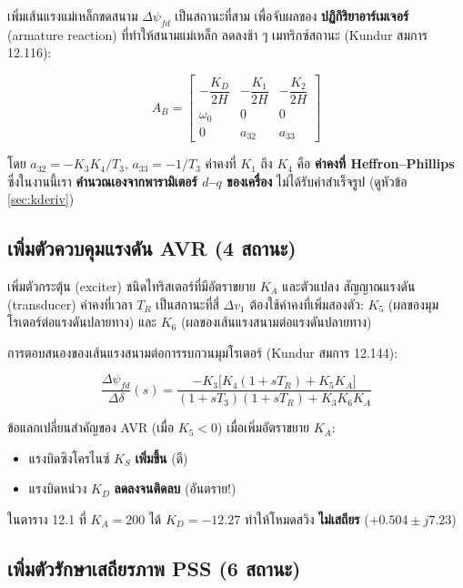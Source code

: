 \documentclass[12pt,a4paper]{article}
\newcommand{\ddel}{\Delta\delta}
\newcommand{\dpsifd}{\Delta\psi_{fd}}
\begin{document}
เพิ่มเส้นแรงแม่เหล็กขดสนาม $\dpsifd$ เป็นสถานะที่สาม เพื่อจับผลของ
\textbf{ปฏิกิริยาอาร์เมเจอร์} (armature reaction) ที่ทำให้สนามแม่เหล็ก
ลดลงช้า ๆ เมทริกซ์สถานะ (Kundur สมการ 12.116):

\begin{equation}
A_B =
\begin{bmatrix}
-\dfrac{K_D}{2H} & -\dfrac{K_1}{2H} & -\dfrac{K_2}{2H} \\[2ex]
\omega_0 & 0 & 0 \\[1ex]
0 & a_{32} & a_{33}
\end{bmatrix}
\end{equation}

โดย $a_{32} = -K_3 K_4/T_3$, $a_{33} = -1/T_3$ ค่าคงที่ $K_1$ ถึง $K_4$
คือ \textbf{ค่าคงที่ Heffron--Phillips} ซึ่งในงานนี้เรา
\textbf{คำนวณเองจากพารามิเตอร์ $d$--$q$ ของเครื่อง} ไม่ได้รับค่าสำเร็จรูป
(ดูหัวข้อ \ref{sec:kderiv})

\subsection{เพิ่มตัวควบคุมแรงดัน AVR (4 สถานะ)}

เพิ่มตัวกระตุ้น (exciter) ชนิดไทริสเตอร์ที่มีอัตราขยาย $K_A$ และตัวแปลง
สัญญาณแรงดัน (transducer) ค่าคงที่เวลา $T_R$ เป็นสถานะที่สี่ $\Delta v_1$
ต้องใช้ค่าคงที่เพิ่มสองตัว: $K_5$ (ผลของมุมโรเตอร์ต่อแรงดันปลายทาง) และ
$K_6$ (ผลของเส้นแรงสนามต่อแรงดันปลายทาง)

การตอบสนองของเส้นแรงสนามต่อการรบกวนมุมโรเตอร์ (Kundur สมการ 12.144):

\begin{equation}
\frac{\dpsifd}{\ddel}(s) =
\frac{-K_3\bigl[K_4(1+sT_R) + K_5 K_A\bigr]}
     {(1+sT_3)(1+sT_R) + K_3 K_6 K_A}
\end{equation}

\begin{keybox}{ข้อแลกเปลี่ยนสำคัญของ AVR (เมื่อ $K_5 < 0$)}
เมื่อเพิ่มอัตราขยาย $K_A$:
\begin{itemize}
  \item แรงบิดซิงโครไนซ์ $K_S$ \textbf{เพิ่มขึ้น} (ดี)
  \item แรงบิดหน่วง $K_D$ \textbf{ลดลงจนติดลบ} (อันตราย!)
\end{itemize}
ในตาราง 12.1 ที่ $K_A = 200$ ได้ $K_D = -12.27$ ทำให้โหมดสวิง
\textbf{ไม่เสถียร} ($+0.504 \pm j7.23$)
\end{keybox}

\subsection{เพิ่มตัวรักษาเสถียรภาพ PSS (6 สถานะ)}
\end{document}
